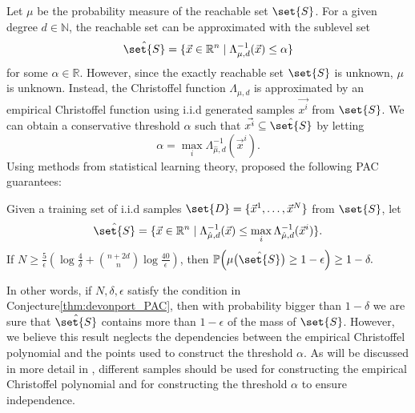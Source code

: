 \documentclass[pmlr]{jmlr}%
\begin{document}
Let $\mu$ be the probability measure of the reachable set $\set{S}$. For a given degree $d \in \mathbb{N}$, the reachable set can be approximated with the sublevel set 
\begin{equation}\label{eq:cpls}
\hat{\set{S}} = \{ \Vec{x} \in \mathbb{R}^{n} \mid \Lambda^{-1}_{\mu, d}(\Vec{x}) \leq \alpha \}
\end{equation}
for some $\alpha \in \mathbb{R}$. However, since the exactly reachable set $\set{S}$ is unknown, $\mu$ is unknown. Instead, the Christoffel function $\Lambda_{\mu, d}$ is approximated by an empirical Christoffel function using i.i.d generated samples $\Vec{x^{i}}$ from $\set{S}$. We can obtain a conservative threshold $\alpha$ such that $\Vec{x^{i}} \subseteq \hat{\set{S}}$ by letting
\begin{equation}\label{eq:maxalpha}
\alpha = \max_i \Lambda^{-1}_{\hat{\mu}, d}(\Vec{x}^{i}).
\end{equation}Using methods from statistical learning theory, \cite{devonport} proposed the following PAC guarantees:
\begin{conjecture}\label{thm:devonport_PAC}
Given a training set of i.i.d samples $\set{D} = \{ \Vec{x}^1, \ldots, \Vec{x}^N\}$ from $\set{S}$, let 
\begin{equation}\label{eq:maxalphaset}
\hat{\set{S}} = \{ \Vec{x} \in \mathbb{R}^{n} \mid \Lambda^{-1}_{\hat{\mu}, d}(\Vec{x}) \leq \max_i \Lambda^{-1}_{\hat{\mu}, d}(\Vec{x}^{i}) \}.
\end{equation}If $N \geq \frac{5}{\epsilon}\left(\log \frac{4}{\delta}+\binom{n+2d}{n} \log \frac{40}{\epsilon}\right)$, then $\mathbb{P}\Bigl( \mu \bigl( \hat{\set{S}} \bigr) \geq 1-\epsilon \Bigr) \geq 1-\delta.$
\end{conjecture}
In other words, if $N,\delta,\epsilon$ satisfy the condition in Conjecture\;\ref{thm:devonport_PAC}, then with probability bigger than $1-\delta$ we are sure that $\hat{\set{S}}$ contains more than $1-\epsilon$ of the mass of $\set{S}$. 
However, we believe this result neglects the dependencies between the empirical Christoffel polynomial and the points used to construct the threshold $\alpha$. As will be discussed in more detail in , different samples should be used for  constructing the empirical Christoffel polynomial and for constructing the threshold $\alpha$ to ensure independence. 
\end{document}
